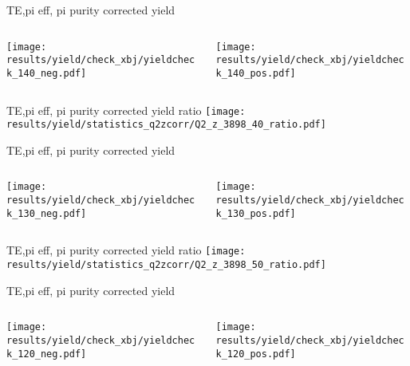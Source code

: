 \begin{frame}{TE,pi eff, pi purity corrected yield}
\begin{columns}
\begin{column}[T]{0.5\textwidth}
\texttt{[image: results/yield/check\_xbj/yieldcheck\_140\_neg.pdf]}
\end{column}
\begin{column}[T]{0.5\textwidth}
\texttt{[image: results/yield/check\_xbj/yieldcheck\_140\_pos.pdf]}
\end{column}
\end{columns}
\end{frame}
\begin{frame}{TE,pi eff, pi purity corrected yield ratio}
\texttt{[image: results/yield/statistics\_q2zcorr/Q2\_z\_3898\_40\_ratio.pdf]}
\end{frame}
\begin{frame}{TE,pi eff, pi purity corrected yield}
\begin{columns}
\begin{column}[T]{0.5\textwidth}
\texttt{[image: results/yield/check\_xbj/yieldcheck\_130\_neg.pdf]}
\end{column}
\begin{column}[T]{0.5\textwidth}
\texttt{[image: results/yield/check\_xbj/yieldcheck\_130\_pos.pdf]}
\end{column}
\end{columns}
\end{frame}
\begin{frame}{TE,pi eff, pi purity corrected yield ratio}
\texttt{[image: results/yield/statistics\_q2zcorr/Q2\_z\_3898\_50\_ratio.pdf]}
\end{frame}
\begin{frame}{TE,pi eff, pi purity corrected yield}
\begin{columns}
\begin{column}[T]{0.5\textwidth}
\texttt{[image: results/yield/check\_xbj/yieldcheck\_120\_neg.pdf]}
\end{column}
\begin{column}[T]{0.5\textwidth}
\texttt{[image: results/yield/check\_xbj/yieldcheck\_120\_pos.pdf]}
\end{column}
\end{columns}
\end{frame}
